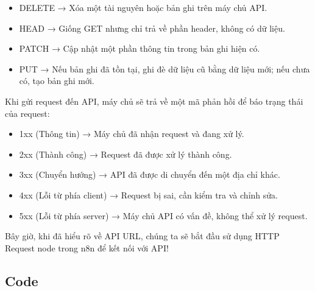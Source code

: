 \begin{enumerate}
\begin{enumerate}
\begin{tcolorbox}[title=Dưới đây là một số phương thức phổ biến:]
\begin{itemize}
    \item DELETE → Xóa một tài nguyên hoặc bản ghi trên máy chủ API.

    \item HEAD → Giống GET nhưng chỉ trả về phần header, không có dữ liệu.

    \item PATCH → Cập nhật một phần thông tin trong bản ghi hiện có.

    \item PUT → Nếu bản ghi đã tồn tại, ghi đè dữ liệu cũ bằng dữ liệu mới; nếu chưa có, tạo bản ghi mới.
\end{itemize}
\end{tcolorbox}




Khi gửi request đến API, máy chủ sẽ trả về một mã phản hồi để báo trạng thái của request:

\begin{tcolorbox}[title=Mã phản hồi HTTP (Response Codes)]
\begin{itemize}
    \item 1xx (Thông tin) → Máy chủ đã nhận request và đang xử lý.

    \item 2xx (Thành công) → Request đã được xử lý thành công.

    \item 3xx (Chuyển hướng) → API đã được di chuyển đến một địa chỉ khác.

    \item 4xx (Lỗi từ phía client) → Request bị sai, cần kiểm tra và chỉnh sửa.

    \item 5xx (Lỗi từ phía server) → Máy chủ API có vấn đề, không thể xử lý request.
\end{itemize}
\end{tcolorbox}





Bây giờ, khi đã hiểu rõ về API URL, chúng ta sẽ bắt đầu sử dụng HTTP Request node trong n8n để kết nối với API! 
\end{enumerate}

\end{enumerate}



\subsection{Code}


